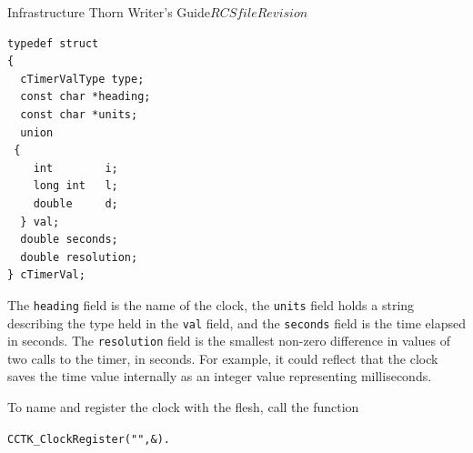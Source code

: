 \begin{cactuspart}{Infrastructure Thorn Writer's Guide}{$RCSfile$}{$Revision$}
\begin{verbatim}
typedef struct
{
  cTimerValType type;
  const char *heading;
  const char *units;
  union
 {
    int        i;
    long int   l;
    double     d;
  } val;
  double seconds;
  double resolution;
} cTimerVal;
\end{verbatim}

The \texttt{heading} field is the name of the clock, the \texttt{units} 
field  holds a string describing the type held in the \texttt{val} field,
and the \texttt{seconds} field is the time elapsed in seconds.  The 
\texttt{resolution} field is the smallest non-zero difference in values 
of two calls to the timer, in seconds.  For example, it could reflect
that the clock saves the time value internally as an integer value 
representing milliseconds.

To name and register the clock with the flesh, call the function
\begin{alltt}
	CCTK_ClockRegister( "", & ).
\end{alltt}




\end{cactuspart}

